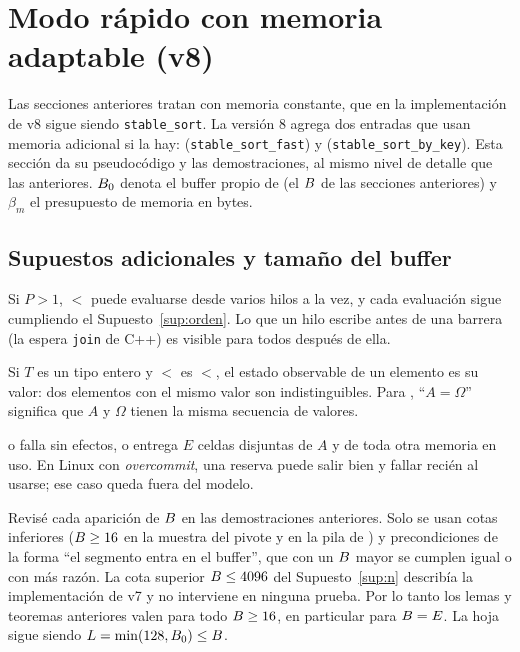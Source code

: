 \section{Modo rápido con memoria adaptable (v8)}\label{sec:rapido}

Las secciones anteriores tratan \SotSort con memoria constante, que en la
implementación de v8 sigue siendo \texttt{stable\_sort}. La versión 8 agrega dos
entradas que usan memoria adicional si la hay: \Rapido (\texttt{stable\_sort\_fast}) y
\PorClave (\texttt{stable\_sort\_by\_key}). Esta sección da su pseudocódigo y las
demostraciones, al mismo nivel de detalle que las anteriores. $B_0$ denota el buffer
propio de \SotSort (el $B$ de las secciones anteriores) y $\beta_m$ el presupuesto
de memoria en bytes.

\subsection{Supuestos adicionales y tamaño del buffer}

\begin{supuesto}[Hilos]\label{sup:hilos}
Si $P>1$, $\lt$ puede evaluarse desde varios hilos a la vez, y cada evaluación sigue
cumpliendo el Supuesto~\ref{sup:orden}. Lo que un hilo escribe antes de una barrera (la
espera \texttt{join} de C++) es visible para todos después de ella.
\end{supuesto}
\begin{supuesto}[Enteros]\label{sup:enteros}
Si $T$ es un tipo entero y $\lt$ es $<$, el estado observable de un elemento es su
valor: dos elementos con el mismo valor son indistinguibles. Para \Conteo, ``$A=\Omega$''
significa que $A$ y $\Omega$ tienen la misma secuencia de valores.
\end{supuesto}
\begin{supuesto}[Reservas]\label{sup:reserva}
 o falla sin efectos, o entrega $E$ celdas disjuntas de $A$ y de toda
otra memoria en uso. En Linux con \emph{overcommit}, una reserva puede salir bien y
fallar recién al usarse; ese caso queda fuera del modelo.
\end{supuesto}

\begin{observacion}\label{obs:bsz}
Revisé cada aparición de $B$ en las demostraciones anteriores. Solo se usan cotas
inferiores ($B\ge 16$ en la muestra del pivote y en la pila de \Part) y
precondiciones de la forma ``el segmento entra en el buffer'', que con un $B$ mayor se
cumplen igual o con más razón. La cota superior $B\le4096$ del
Supuesto~\ref{sup:n} describía la implementación de v7 y no interviene en ninguna
prueba. Por lo tanto los lemas y teoremas anteriores valen para todo $B\ge 16$, en
particular para $B=E$. La hoja sigue siendo $L=\min(128,B_0)\le B$.
\end{observacion}

